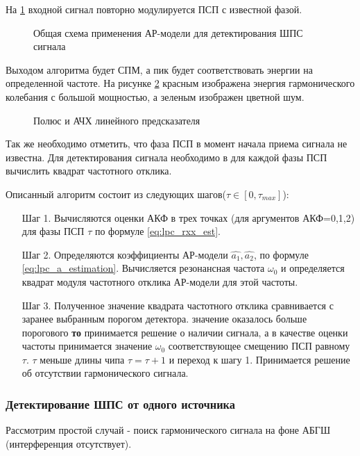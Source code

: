 На \ref{pic:lpc_basic1} входной сигнал повторно модулируется ПСП с известной фазой.

\begin{figure}[H]
	\center{}
	\caption{Общая схема применения АР-модели для детектирования ШПС сигнала}
	\label{pic:lpc_basic1}
\end{figure}

Выходом алгоритма будет СПМ, а пик будет соответствовать энергии на определенной частоте. На рисунке
\ref{pic:lpc_poles_gps} красным изображена энергия гармонического колебания с большой мощностью, а
зеленым изображен цветной шум.
\begin{figure}[H]
	\center{}
	\caption{Полюс и АЧХ линейного предсказателя}
	\label{pic:lpc_poles_gps}
\end{figure}

Так же необходимо отметить, что фаза ПСП в момент начала приема сигнала не известна.
Для детектирования сигнала необходимо в для каждой фазы ПСП вычислить квадрат частотного
отклика.

Описанный алгоритм состоит из следующих шагов(${\tau \in [0, \tau_{max}]}$):

\begin{itemize}
\item[Шаг 1.] Вычисляются оценки АКФ в трех точках (для аргументов АКФ=0,1,2)
	для фазы ПСП ${\tau}$ по формуле \ref{eq:lpc_rxx_est}. 
\item[Шаг 2.] Определяются коэффициенты АР-модели ${\hat{a_1}, \hat{a_2}}$, 
	по формуле \ref{eq:lpc_a_estimation}. 
	Вычисляется резонансная частота ${\omega_0}$
	и определяется квадрат модуля частотного отклика АР-модели для этой частоты. 
\item[Шаг 3.] Полученное значение квадрата частотного отклика сравнивается с заранее выбранным порогом детектора. 
	  значение оказалось больше порогового {\bf{то}} 
		принимается решение о наличии сигнала, а в качестве оценки
		частоты принимается значение ${\omega_0}$ соответствующее смещению ПСП равному ${\tau}$. 
	 ${\tau}$ меньше длины чипа ${\tau = \tau + 1}$ и переход к шагу 1.
		Принимается решение об отсутствии гармонического сигнала.
\end{itemize}

\subsubsection{Детектирование ШПС от одного источника}
Рассмотрим простой случай - поиск гармонического сигнала на фоне АБГШ (интерференция отсутствует).

